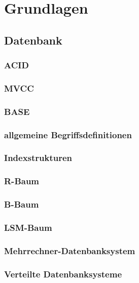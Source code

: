 \chapter{Grundlagen}


\section{Datenbank}

\subsection{ACID}

\subsection{MVCC}

\subsection{BASE}

\subsection{allgemeine Begriffsdefinitionen}

\subsection{Indexstrukturen}

\subsection{R-Baum}

\subsection{B-Baum}

\subsection{LSM-Baum}

\subsection{Mehrrechner-Datenbanksystem}

\subsection{Verteilte Datenbanksysteme}

